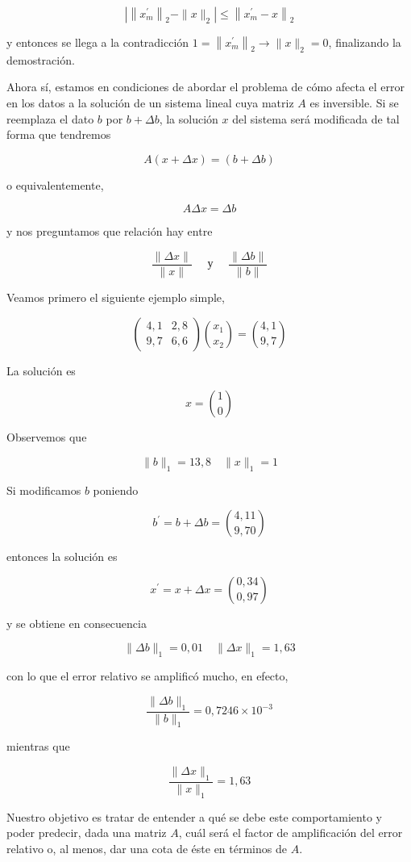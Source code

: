 \documentclass[10pt]{article}
\begin{document}
$$
\left|\left\|x_{m}^{\prime}\right\|_{2}-\|x\|_{2}\right| \leq\left\|x_{m}^{\prime}-x\right\|_{2}
$$

y entonces se llega a la contradicción $1=\left\|x_{m}^{\prime}\right\|_{2} \rightarrow\|x\|_{2}=0$, finalizando la demostración.

Ahora sí, estamos en condiciones de abordar el problema de cómo afecta el error en los datos a la solución de un sistema lineal cuya matriz $A$ es inversible. Si se reemplaza el dato $b$ por $b+\Delta b$, la solución $x$ del sistema será modificada de tal forma que tendremos

$$
A(x+\Delta x)=(b+\Delta b)
$$

o equivalentemente,

$$
A \Delta x=\Delta b
$$

y nos preguntamos que relación hay entre

$$
\frac{\|\Delta x\|}{\|x\|} \quad \text { у } \quad \frac{\|\Delta b\|}{\|b\|}
$$

Veamos primero el siguiente ejemplo simple,

$$
\left(\begin{array}{cc}
4,1 & 2,8 \\
9,7 & 6,6
\end{array}\right)\binom{x_{1}}{x_{2}}=\binom{4,1}{9,7}
$$

La solución es

$$
x=\binom{1}{0}
$$

Observemos que

$$
\|b\|_{1}=13,8 \quad\|x\|_{1}=1
$$

Si modificamos $b$ poniendo

$$
b^{\prime}=b+\Delta b=\binom{4,11}{9,70}
$$

entonces la solución es

$$
x^{\prime}=x+\Delta x=\binom{0,34}{0,97}
$$

y se obtiene en consecuencia

$$
\|\Delta b\|_{1}=0,01 \quad\|\Delta x\|_{1}=1,63
$$

con lo que el error relativo se amplificó mucho, en efecto,

$$
\frac{\|\Delta b\|_{1}}{\|b\|_{1}}=0,7246 \times 10^{-3}
$$

mientras que

$$
\frac{\|\Delta x\|_{1}}{\|x\|_{1}}=1,63
$$

Nuestro objetivo es tratar de entender a qué se debe este comportamiento y poder predecir, dada una matriz $A$, cuál será el factor de amplificación del error relativo o, al menos, dar una cota de éste en términos de $A$.
\end{document}
